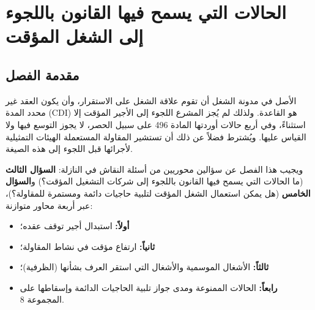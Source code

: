 
\chapter{الحالات التي يسمح فيها القانون باللجوء إلى الشغل المؤقت}
\label{chap:chapitre3}

\section*{مقدمة الفصل}

الأصل في مدونة الشغل أن تقوم علاقة الشغل على الاستقرار، وأن يكون العقد غير محدد المدة (\textenglish{CDI}) هو القاعدة. ولذلك لم يُجز المشرع اللجوء إلى الأجير المؤقت إلا استثناءً، وفي أربع حالات أوردتها المادة \textenglish{496} على سبيل الحصر، لا يجوز التوسع فيها ولا القياس عليها. ويُشترط فضلاً عن ذلك أن تستشير المقاولة المستعملة الهيئات التمثيلية لأجرائها قبل اللجوء إلى هذه الصيغة.

ويجيب هذا الفصل عن سؤالين محوريين من أسئلة النقاش في النازلة: \textbf{السؤال الثالث} (ما الحالات التي يسمح فيها القانون باللجوء إلى شركات التشغيل المؤقت؟) و\textbf{السؤال الخامس} (هل يمكن استعمال الشغل المؤقت لتلبية حاجيات دائمة ومستمرة للمقاولة؟)، عبر أربعة محاور متوازنة:
\begin{itemize}[leftmargin=*, itemsep=4pt]
    \item \textbf{أولاً:} استبدال أجير توقف عقده؛
    \item \textbf{ثانياً:} ارتفاع مؤقت في نشاط المقاولة؛
    \item \textbf{ثالثاً:} الأشغال الموسمية والأشغال التي استقر العرف بشأنها (الظرفية)؛
    \item \textbf{رابعاً:} الحالات الممنوعة ومدى جواز تلبية الحاجيات الدائمة وإسقاطها على المجموعة \textenglish{8}.
\end{itemize}


